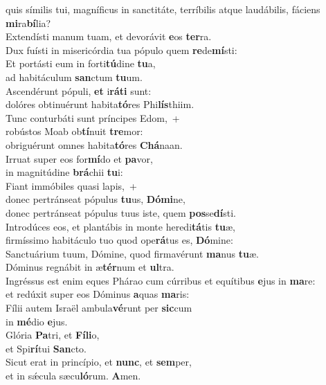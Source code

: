 \evenverse quis símilis tui, magníficus in sanctitáte, terríbilis atque laudábilis, fáciens \textbf{mi}ra\textbf{bí}lia?\\
\oddverse Extendísti manum tuam, et devorávit \textbf{e}os \textbf{ter}ra.~\*\\
\oddverse Dux fuísti in misericórdia tua pópulo quem \textbf{re}de\textbf{mí}sti:\\
\evenverse Et portásti eum in forti\textbf{tú}dine \textbf{tu}a,~\*\\
\evenverse ad habitáculum \textbf{san}ctum \textbf{tu}um.\\
\oddverse Ascendérunt pópuli, \textbf{et} i\textbf{rá}\textbf{ti} sunt:~\*\\
\oddverse dolóres obtinuérunt habita\textbf{tó}res Phi\textbf{lís}thiim.\\
\evenverse Tunc conturbáti sunt príncipes Edom,~+\\
\evenverse  robústos Moab ob\textbf{tí}nuit \textbf{tre}mor:~\*\\
\evenverse obriguérunt omnes habita\textbf{tó}res \textbf{Chá}naan.\\
\oddverse Irruat super eos for\textbf{mí}do et \textbf{pa}vor,~\*\\
\oddverse in magnitúdine \textbf{brá}chii \textbf{tu}i:\\
\evenverse Fiant immóbiles quasi lapis,~+\\
\evenverse  donec pertránseat pópulus \textbf{tu}us, \textbf{Dó}\textbf{mi}ne,~\*\\
\evenverse donec pertránseat pópulus tuus iste, quem \textbf{pos}se\textbf{dí}sti.\\
\oddverse Introdúces eos, et plantábis in monte heredi\textbf{tá}tis \textbf{tu}æ,~\*\\
\oddverse firmíssimo habitáculo tuo quod ope\textbf{rá}tus es, \textbf{Dó}mine:\\
\evenverse Sanctuárium tuum, Dómine, quod firmavérunt \textbf{ma}nus \textbf{tu}æ.~\*\\
\evenverse Dóminus regnábit in æ\textbf{tér}num et \textbf{ul}tra.\\
\oddverse Ingréssus est enim eques Phárao cum cúrribus et equítibus \textbf{e}jus in \textbf{ma}re:~\*\\
\oddverse et redúxit super eos Dóminus \textbf{a}quas \textbf{ma}ris:\\
\evenverse Fílii autem Israël ambula\textbf{vé}runt per \textbf{sic}cum~\*\\
\evenverse in \textbf{mé}dio \textbf{e}jus.\\
\oddverse Glória \textbf{Pa}tri, et \textbf{Fí}\textbf{li}o,~\*\\
\oddverse et Spi\textbf{rí}tui \textbf{San}cto.\\
\evenverse Sicut erat in princípio, et \textbf{nunc}, et \textbf{sem}per,~\*\\
\evenverse et in sǽcula sæcu\textbf{ló}rum. \textbf{A}men.\\
